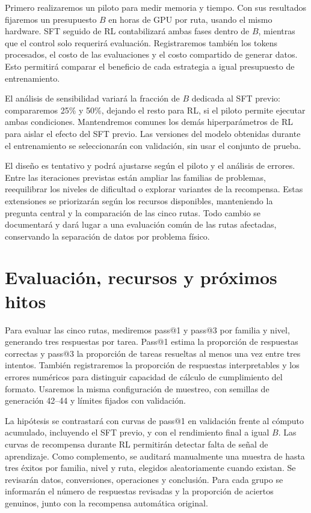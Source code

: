 Primero realizaremos un piloto para medir memoria y tiempo. Con sus resultados
fijaremos un presupuesto $B$ en horas de GPU por ruta, usando el mismo hardware.
SFT seguido de RL contabilizará ambas fases dentro de $B$, mientras que el
control solo requerirá evaluación. Registraremos también los tokens procesados,
el costo de las evaluaciones y el costo compartido de generar datos. Esto permitirá
comparar el beneficio de cada estrategia a igual presupuesto de entrenamiento.

El análisis de sensibilidad variará la fracción de $B$ dedicada al SFT previo:
compararemos 25\% y 50\%, dejando el resto para RL, si el piloto permite ejecutar
ambas condiciones. Mantendremos comunes los demás hiperparámetros de RL para
aislar el efecto del SFT previo. Las versiones del modelo obtenidas durante el
entrenamiento se seleccionarán con validación, sin usar el conjunto de prueba.

El diseño es tentativo y podrá ajustarse según el piloto y el análisis de errores.
Entre las iteraciones previstas están ampliar las familias de problemas,
reequilibrar los niveles de dificultad o explorar variantes de la recompensa.
Estas extensiones se priorizarán según los recursos disponibles, manteniendo
la pregunta central y la comparación de las cinco rutas. Todo cambio se documentará
y dará lugar a una evaluación común de las rutas afectadas, conservando la
separación de datos por problema físico.

\section{Evaluación, recursos y próximos hitos}
Para evaluar las cinco rutas, mediremos pass@1 y pass@3 por familia y nivel,
generando tres respuestas por tarea.
Pass@1 estima la proporción de respuestas correctas y pass@3 la proporción de
tareas resueltas al menos una vez entre tres intentos. También registraremos la
proporción de respuestas interpretables y los errores numéricos para distinguir
capacidad de cálculo de cumplimiento del formato. Usaremos la misma configuración
de muestreo, con semillas de generación 42--44 y límites fijados con validación.

La hipótesis se contrastará con curvas de pass@1 en validación frente al cómputo
acumulado, incluyendo el SFT previo, y con el rendimiento final a igual $B$.
Las curvas de recompensa durante RL permitirán detectar falta de señal de aprendizaje.
Como complemento, se auditará manualmente una muestra de hasta tres éxitos por
familia, nivel y ruta, elegidos aleatoriamente cuando existan. Se revisarán datos,
conversiones, operaciones y conclusión. Para cada grupo se informarán el número
de respuestas revisadas y la proporción de aciertos genuinos, junto con la
recompensa automática original.

